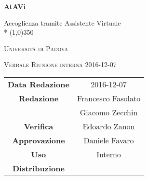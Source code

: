 \documentclass[a4paper,12pt]{article}
\author{Nome Autore}
\date{05/01/2016}
\begin{document}
\begin{titlepage}
	\centering
	{\huge\bfseries AtAVi\par}
	Accoglienza tramite Assistente Virtuale \\*
	\line(1,0){350} \\
	{\scshape\LARGE Università di Padova \par}
	\vspace{1cm}
	{\scshape\Large Verbale Riunione interna 2016-12-07\par}
	\vspace{1.5cm}
	\logo
	\vspace{2cm}	
	\vfill \vfill
	\begin{tabular}{c|c}
		{\hfill\textbf{Data Redazione}} 		& 2016-12-07		\\
		{\hfill\textbf{Redazione}} 			& Francesco	Fasolato\\ & Giacomo Zecchin\\
		{\hfill\textbf{Verifica}} 				& Edoardo Zanon 	\\
		{\hfill\textbf{Approvazione}} 				& Daniele Favaro 	\\
		{\hfill\textbf{Uso}} 					& Interno			\\
		{\hfill\textbf{Distribuzione}} 		& \kpanic\			\\
	\end{tabular}
\end{titlepage}

	\pagestyle{myfront}
	\newpage
	\tableofcontents
	
	\label{LastFrontPage}
	\newpage
	\pagestyle{mymain}
		
		
		
		
		
		
		
			
	\label{LastPage}
\end{document}
